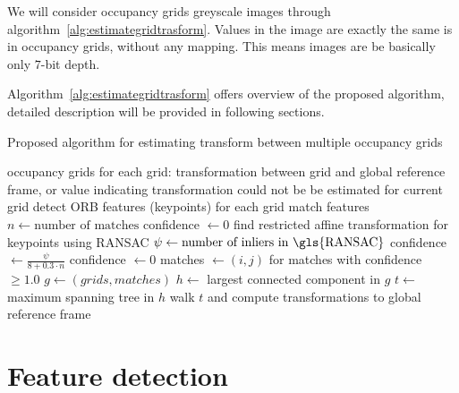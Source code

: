 We will consider occupancy grids greyscale images through algorithm~\ref{alg:estimategridtrasform}. Values in the image are exactly the same is in occupancy grids, without any mapping. This means images are be basically only $7$-bit depth.

Algorithm~\ref{alg:estimategridtrasform} offers overview of the proposed algorithm, detailed description will be provided in following sections.

\begin{algorithm}
    \caption{Proposed algorithm for estimating transform between multiple occupancy grids}
    \label{alg:estimategridtrasform}
    \begin{algorithmic}[1]
        \Require occupancy grids
        \Ensure for each grid: transformation between grid and global reference frame, or value indicating transformation could not be be estimated for current grid
            \State detect \gls{ORB} features (keypoints) for each grid
             
            	\State match features
            	\State $n \gets \text{number of matches}$
            		\State confidence $\gets 0$
            	\Else
            		\State find restricted affine transformation for keypoints using \gls{RANSAC}
            		\State $\psi \gets \text{number of inliers in \gls{RANSAC}}$
            			\State confidence $\gets \frac{\psi}{8 + 0.3 \cdot n}$
            		\Else
            			\State confidence $\gets 0$
            		\EndIf
            	\EndIf
            \EndFor
            \State matches $\gets (i,j)$ for matches with confidence $\ge 1.0$
            \State $g \gets (grids, matches)$
            \State $h \gets$ largest connected component in $g$
            \State $t \gets$ maximum spanning tree in $h$
            \State walk $t$ and compute transformations to global reference frame
        \EndProcedure
    \end{algorithmic}
\end{algorithm}


\section{Feature detection} %
\label{sec:featuredetection}

